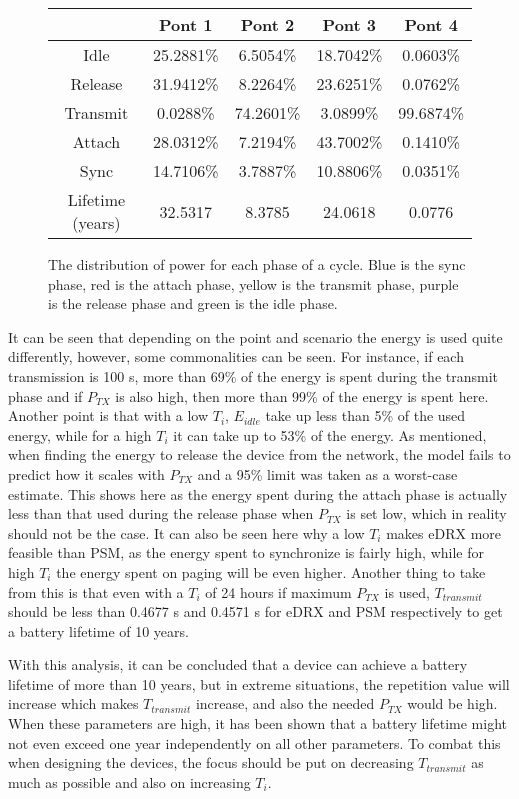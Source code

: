 \begin{figure}[H]
\begin{minipage}{0.48\textwidth}
\begin{table}[H]
{\begin{tabular}{|c|c|c|c|c|}
 & Pont 1    & Pont 2    & Pont 3    & Pont 4    \\ \hline
\cellcolor{mycolor5}Idle    & 25.2881\%     & 6.5054\%    & 18.7042\%    & 0.0603\%\\ \hline
\cellcolor{mycolor4}Release    & 31.9412\%     & 8.2264\%    & 23.6251\%    & 0.0762\%\\ \hline
\cellcolor{mycolor3}Transmit    & 0.0288\%     & 74.2601\%    & 3.0899\%    & 99.6874\%\\ \hline
\cellcolor{mycolor2}Attach    & 28.0312\%     & 7.2194\%    & 43.7002\%    & 0.1410\%\\ \hline
\cellcolor{mycolor1}Sync    & 14.7106\%     & 3.7887\%    & 10.8806\%    & 0.0351\%\\ \hline
Lifetime (years)    & 32.5317     & 8.3785    & 24.0618    & 0.0776\\ \hline
\end{tabular}}
\end{table}
\end{minipage}
\caption{The distribution of power for each phase of a cycle. Blue is the sync phase, red is the attach phase, yellow is the transmit phase, purple is the release phase and green is the idle phase.}
\label{fig:barplot_plots}
\end{figure}

It can be seen that depending on the point and scenario the energy is used quite differently, however, some commonalities can be seen. For instance, if each transmission is 100 s, more than 69\% of the energy is spent during the transmit phase and if $P_{TX}$ is also high, then more than 99\% of the energy is spent here. Another point is that with a low $T_i$, $E_{idle}$ take up less than 5\% of the used energy, while for a high $T_i$ it can take up to 53\% of the energy. As mentioned, when finding the energy to release the device from the network, the model fails to predict how it scales with $P_{TX}$ and a 95\% limit was taken as a worst-case estimate. This shows here as the energy spent during the attach phase is actually less than that used during the release phase when $P_{TX}$ is set low, which in reality should not be the case. It can also be seen here why a low $T_i$ makes eDRX more feasible than PSM, as the energy spent to synchronize is fairly high, while for high $T_i$ the energy spent on paging will be even higher. Another thing to take from this is that even with a $T_i$ of 24 hours if maximum $P_{TX}$ is used, $T_{transmit}$ should be less than 0.4677 s and 0.4571 s for eDRX and PSM respectively to get a battery lifetime of 10 years. 


With this analysis, it can be concluded that a device can achieve a battery lifetime of more than 10 years, but in extreme situations, the repetition value will increase which makes $T_{transmit}$ increase, and also the needed $P_{TX}$ would be high. When these parameters are high, it has been shown that a battery lifetime might not even exceed one year independently on all other parameters. To combat this when designing the devices, the focus should be put on decreasing $T_{transmit}$ as much as possible and also on increasing $T_i$. 
